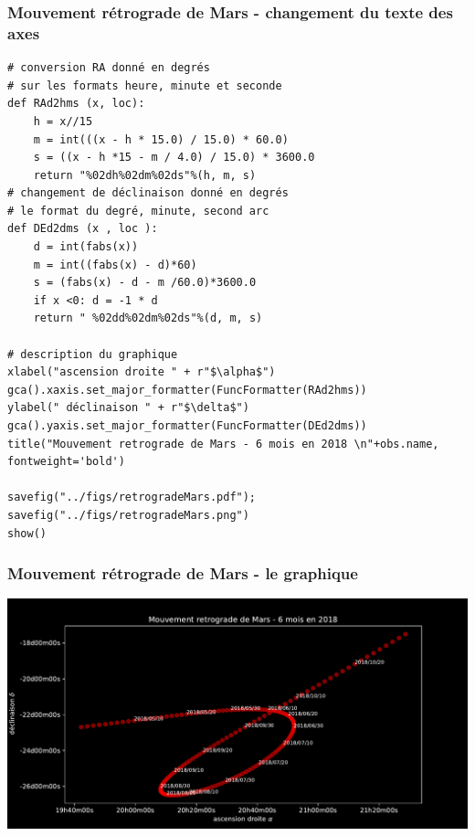 \documentclass{beamer}
\begin{document}
\begin{frame}
\frametitle{Mouvement rétrograde de Mars - changement du texte des axes}

\begin{verbatim}
# conversion RA donné en degrés
# sur les formats heure, minute et seconde
def RAd2hms (x, loc):
    h = x//15
    m = int(((x - h * 15.0) / 15.0) * 60.0)
    s = ((x - h *15 - m / 4.0) / 15.0) * 3600.0
    return "%02dh%02dm%02ds"%(h, m, s)
# changement de déclinaison donné en degrés
# le format du degré, minute, second arc
def DEd2dms (x , loc ):
    d = int(fabs(x))
    m = int((fabs(x) - d)*60)
    s = (fabs(x) - d - m /60.0)*3600.0
    if x <0: d = -1 * d
    return " %02dd%02dm%02ds"%(d, m, s)

# description du graphique
xlabel("ascension droite " + r"$\alpha$")
gca().xaxis.set_major_formatter(FuncFormatter(RAd2hms))
ylabel(" déclinaison " + r"$\delta$")
gca().yaxis.set_major_formatter(FuncFormatter(DEd2dms))
title("Mouvement retrograde de Mars - 6 mois en 2018 \n"+obs.name, fontweight='bold')

savefig("../figs/retrogradeMars.pdf"); savefig("../figs/retrogradeMars.png")
show()
\end{verbatim}
\end{frame}

\begin{frame}
\frametitle{Mouvement rétrograde de Mars - le graphique}

\vspace{6mm}

\centerline{\includegraphics[width=0.9\linewidth]{figs/retrogradeMars.pdf}}

\vspace{6mm}
\end{frame}
\end{document}
